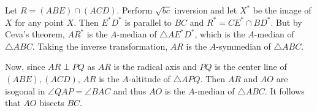 Let $R=\left(ABE\right)\cap\left(ACD\right)$. Perform $\sqrt{bc}$ inversion and let $X^*$ be the image of $X$ for any point $X$. Then $E^*D^*$ is parallel to $BC$ and $R^*=CE^*\cap BD^*$. But by Ceva's theorem, $AR^*$ is the $A$-median of $\triangle{AE^*D^*}$, which is the $A$-median of $\triangle{ABC}$. Taking the inverse transformation, $AR$ is the $A$-symmedian of $\triangle{ABC}$.

Now, since $AR\perp PQ$ as $AR$ is the radical axis and $PQ$ is the center line of $\left(ABE\right),\left(ACD\right)$, $AR$ is the $A$-altitude of $\triangle{APQ}$. Then $AR$ and $AO$ are isogonal in $\angle{QAP}=\angle{BAC}$ and thus $AO$ is the $A$-median of $\triangle{ABC}$. It follows that $AO$ bisects $BC$.
